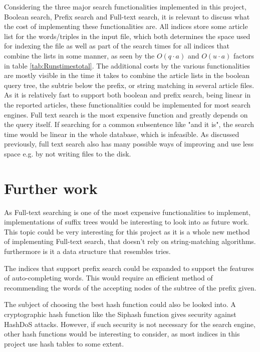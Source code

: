 Considering the three major search functionalities implemented in this project, Boolean search, Prefix search and Full-text search, it is relevant to discuss what the cost of implementing these functionalities are. All indices store some article list for the words/triples in the input file, which both determines the space used for indexing the file as well as part of the search times for all indices that combine the lists in some manner, as seen by the $O(q\cdot a)$ and $O(u\cdot a)$ factors in table \ref{tab:Runstimestotal}. The additional costs by the various functionalities are mostly visible in the time it takes to combine the article lists in the boolean query tree, the subtrie below the prefix, or string matching in several article files. As it is relatively fast to support both boolean and prefix search, being linear in the reported articles, these functionalities could be implemented for most search engines. Full text search is the most expensive function and greatly depends on the query itself. If searching for a common subsentence like "and it is", the search time would be linear in the whole database, which is infeasible. As discussed previously, full text search also has many possible ways of improving and use less space e.g. by not writing files to the disk. 

\section{Further work}

As Full-text searching is one of the most expensive functionalities to implement, implementations of suffix trees would be interesting to look into as future work. This topic could be very interesting for this project as it is a whole new method of implementing Full-text search, that doesn't rely on string-matching algorithms. furthermore is it a data structure that resembles tries. 

The indices that support prefix search could be expanded to support the features of auto-completing words. This would require an efficient method of recommending the words of the accepting nodes of the subtree of the prefix given.

The subject of choosing the best hash function could also be looked into. A cryptographic hash function like the Siphash function gives security against HashDoS attacks. However, if such security is not necessary for the search engine, other hash functions would be interesting to consider, as most indices in this project use hash tables to some extent. 

